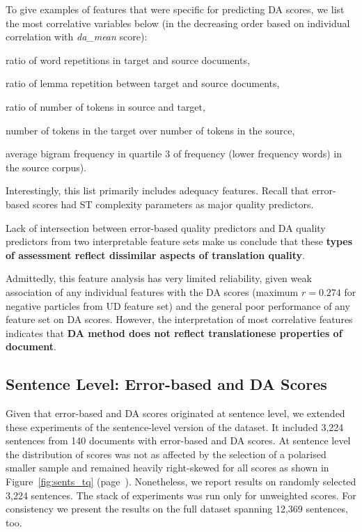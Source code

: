 To give examples of features that were specific for predicting DA scores, we list the most correlative variables below (in the decreasing order based on individual correlation with \textit{da\_mean} score): 
\begin{description}\compresslist{}
	\item[9992] ratio of word repetitions in target and source documents,
	\item[9993] ratio of lemma repetition between target and source documents,
	\item[1003] ratio of number of tokens in source and target,
	\item[1004] number of tokens in the target over number of tokens in the source,
	\item[1052] average bigram frequency in quartile 3 of frequency (lower frequency words) in the source corpus).
\end{description}

Interestingly, this list primarily includes adequacy features. Recall that error-based scores had ST complexity parameters as major quality predictors. 

Lack of intersection between error-based quality predictors and DA quality predictors from two interpretable feature sets make us conclude that these \textbf{types of assessment reflect dissimilar aspects of translation quality}. 

Admittedly, this feature analysis has very limited reliability, given weak association of any individual features with the DA scores (maximum $r=0.274$ for negative particles from UD feature set) and the general poor performance of any feature set on DA scores. 
However, the interpretation of most correlative features indicates that \textbf{DA method does not reflect translationese properties of document}.

\subsection{\label{ssec:sent_level}Sentence Level: Error-based and DA Scores}
Given that error-based and DA scores originated at sentence level, we extended these experiments of the sentence-level version of the dataset. It included 3,224 sentences from 140 documents with error-based and DA scores. At sentence level the distribution of scores was not as affected by the selection of a polarised smaller sample and remained heavily right-skewed for all scores as shown in Figure~\ref{fig:sents_tq} (page~\pageref{fig:sents_tq}). Nonetheless, we report results on randomly selected 3,224 sentences. The stack of experiments was run only for unweighted scores. For consistency we present the results on the full dataset spanning 12,369 sentences, too.

